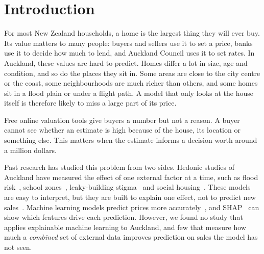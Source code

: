 \documentclass[conference]{IEEEtran}
\begin{document}
\section{Introduction}\label{sec:intro}

For most New Zealand households, a home is the largest thing they will
ever buy. Its value matters to many people: buyers and sellers use it to
set a price, banks use it to decide how much to lend, and Auckland
Council uses it to set rates. In Auckland, these values are hard to
predict. Homes differ a lot in size, age and condition, and so do the
places they sit in. Some areas are close to the city centre or the coast,
some neighbourhoods are much richer than others, and some homes sit in a
flood plain or under a flight path. A model that only looks at the house
itself is therefore likely to miss a large part of its price.

Free online valuation tools give buyers a number but not a reason. A
buyer cannot see whether an estimate is high because of the house, its
location or something else. This matters when the estimate informs a
decision worth around a million dollars.

Past research has studied this problem from two sides. Hedonic studies
of Auckland have measured the effect of one external factor at a time,
such as flood risk~\cite{samarasinghe2010}, school
zones~\cite{rehm2008}, leaky-building stigma~\cite{rehm2009} and social
housing~\cite{sequeira2021}. These models are easy to interpret, but they are
built to explain one effect, not to predict new
sales~\cite{shmueli2010}. Machine learning models predict prices more
accurately~\cite{ceh2018,an2025}, and SHAP~\cite{lundberg2017} can show
which features drive each prediction. However, we found no study that
applies explainable machine learning to Auckland, and few that measure
how much a \emph{combined} set of external data improves prediction on
sales the model has not seen.
\end{document}
